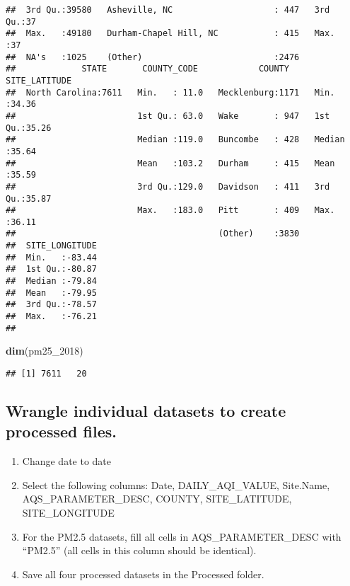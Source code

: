 \documentclass[]{article}
\newenvironment{Shaded}{\begin{snugshade}}{\end{snugshade}}
\newcommand{\KeywordTok}[1]{\textcolor[rgb]{0.13,0.29,0.53}{\textbf{#1}}}
\newcommand{\DecValTok}[1]{\textcolor[rgb]{0.00,0.00,0.81}{#1}}
\newcommand{\NormalTok}[1]{#1}
\providecommand{\tightlist}{%
  \setlength{\itemsep}{0pt}\setlength{\parskip}{0pt}}
\begin{document}
\begin{verbatim}
##  3rd Qu.:39580   Asheville, NC                    : 447   3rd Qu.:37  
##  Max.   :49180   Durham-Chapel Hill, NC           : 415   Max.   :37  
##  NA's   :1025    (Other)                          :2476               
##             STATE       COUNTY_CODE            COUNTY     SITE_LATITUDE  
##  North Carolina:7611   Min.   : 11.0   Mecklenburg:1171   Min.   :34.36  
##                        1st Qu.: 63.0   Wake       : 947   1st Qu.:35.26  
##                        Median :119.0   Buncombe   : 428   Median :35.64  
##                        Mean   :103.2   Durham     : 415   Mean   :35.59  
##                        3rd Qu.:129.0   Davidson   : 411   3rd Qu.:35.87  
##                        Max.   :183.0   Pitt       : 409   Max.   :36.11  
##                                        (Other)    :3830                  
##  SITE_LONGITUDE  
##  Min.   :-83.44  
##  1st Qu.:-80.87  
##  Median :-79.84  
##  Mean   :-79.95  
##  3rd Qu.:-78.57  
##  Max.   :-76.21  
## 
\end{verbatim}

\begin{Shaded}
\begin{Highlighting}[]
\KeywordTok{dim}\NormalTok{(pm25_}\DecValTok{2018}\NormalTok{)}
\end{Highlighting}
\end{Shaded}

\begin{verbatim}
## [1] 7611   20
\end{verbatim}

\subsection{Wrangle individual datasets to create processed
files.}\label{wrangle-individual-datasets-to-create-processed-files.}

\begin{enumerate}
\def\labelenumi{\arabic{enumi}.}
\setcounter{enumi}{2}
\tightlist
\item
  Change date to date
\item
  Select the following columns: Date, DAILY\_AQI\_VALUE, Site.Name,
  AQS\_PARAMETER\_DESC, COUNTY, SITE\_LATITUDE, SITE\_LONGITUDE
\item
  For the PM2.5 datasets, fill all cells in AQS\_PARAMETER\_DESC with
  ``PM2.5'' (all cells in this column should be identical).
\item
  Save all four processed datasets in the Processed folder.
\end{enumerate}
\end{document}
